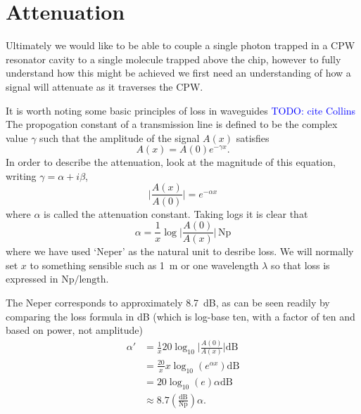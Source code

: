 \documentclass[a4paper]{article}
\newcommand{\cm}[1]{\textcolor{blue}{#1}} %
\begin{document}


\section{Attenuation}

Ultimately we would like to be able to couple a single photon trapped in a CPW
resonator cavity to a single molecule trapped above the chip, however to fully
understand how this might be achieved we first need an understanding of how a
signal will attenuate as it traverses the CPW.

It is worth noting some basic principles of loss in waveguides \cm{TODO: cite
Collins}
The propogation constant of a transmission line is defined to be the complex
value $\gamma$ such that the amplitude of the signal $A(x)$ satisfies
\begin{equation}
  A(x) = A(0)e^{-\gamma x}.
\end{equation}
In order to describe the attenuation, look at the magnitude of this equation,
writing $\gamma = \alpha +i\beta$,
\begin{equation}
  \lvert\frac{A(x)}{A(0)}\rvert = e^{-\alpha x}
\end{equation}
where $\alpha$ is called the attenuation constant. Taking logs it is clear that
\begin{equation}
  \alpha = \frac{1}{x}\log\lvert\frac{A(0)}{A(x)}\rvert\,\si{\neper}
\end{equation}
where we have used `Neper' as the natural unit to desribe loss. We will normally
set $x$ to something sensible such as \SI{1}{\meter} or one wavelength $\lambda$
so that loss is expressed in $\si{\neper}/\mathrm{length}$.

The Neper corresponds to approximately \SI{8.7}{\dB}, as can be seen readily by
comparing the loss formula in dB (which is log-base ten, with a factor of ten
and based on power, not amplitude)
\begin{align*}
  \alpha' &= \frac{1}{x}20\log_{10}\lvert \frac{A(0)}{A(x)} \rvert \si{\dB}\\
          &= \frac{20}{x}{x}\log_{10}(e^{\alpha x}) \si{\dB} \\
          &= 20 \log_{10}(e) \alpha \si{\dB} \\
          &\approx 8.7 \left(\frac{\si{\dB}}{\si{\neper}}\right) \alpha.
\end{align*}
\end{document}
